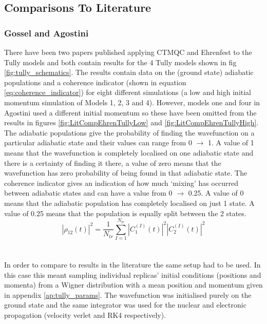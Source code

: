 \subsection{Comparisons To Literature}
\subsubsection{Gossel and Agostini}
\label{sect:EhrenCompare}
There have been two papers published applying CTMQC and Ehrenfest to the Tully models \cite{gossel_coupled-trajectory_2018, agostini_quantum-classical_2016} and both contain results for the 4 Tully models shown in fig \ref{fig:tully_schematics}. The results contain data on the (ground state) adiabatic populations and a coherence indicator (shown in equation \eqref{eq:coherence_indicator}) for eight different simulations (a low and high initial momentum simulation of Models 1, 2, 3 and 4). However, models one and four in Agostini \cite{agostini_quantum-classical_2016} used a different initial momentum so these have been omitted from the results in figures \ref{fig:LitCompEhrenTullyLow} and \ref{fig:LitCompEhrenTullyHigh}. The adiabatic populations give the probability of finding the wavefunction on a particular adiabatic state and their values can range from 0 $\rightarrow$ 1. A value of 1 means that the wavefunction is completely localised on one adiabatic state and there is a certainty of finding it there, a value of zero means that the wavefunction has zero probability of being found in that adiabatic state. The coherence indicator gives an indication of how much `mixing' has occurred between adiabatic states and can have a value from 0 $\rightarrow$ 0.25. A value of 0 means that the adiabatic population has completely localised on just 1 state. A value of 0.25 means that the population is equally split between the 2 states.
\begin{equation}
	|\rho_{12}(t)|^2 = \frac{1}{N_{tr}} \sum_{I=1}^{N_{tr}} |C_{1}^{(I)}(t)|^2 |C_{2}^{(I)}(t)|^2
	\label{eq:coherence_indicator}
\end{equation}
\\\\
In order to compare to results in the literature the same setup had to be used. In this case this meant sampling individual replicas' initial conditions (positions and momenta) from a Wigner distribution with a mean position and momentum given in appendix \ref{ap:tully_params}. The wavefunction was initialised purely on the ground state and the same integrator was used for the nuclear and electronic propagation (velocity verlet and RK4 respectively).
